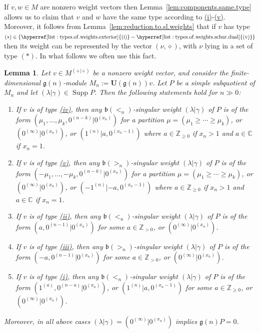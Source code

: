 \documentclass[12pt]{amsart}
\newcommand\C{\mathbb{C}}
\newcommand\Z{\mathbb{Z}}
\newcommand\g{\mathfrak{g}}
\newcommand\fb{\mathfrak{b}}
\newcommand\bU{\mathbf{U}}
\DeclareMathOperator{\Supp}{Supp} %
\theoremstyle{plain}
\newtheorem{lem}[theo]{Lemma}
\theoremstyle{definition}
\numberwithin{equation}{section}
\begin{document}
If $v, w\in M$ are nonzero weight vectors then Lemma~\ref{lem:components.same.type} allows us to claim that $v$ and $w$ have the same type according to \hyperref[list:types.of.weights.exterior]{(i)}-\hyperref[list:types.of.weights.schur.dual]{(v)}. Moreover, it follows from Lemma~\ref{lem:reduction.to.sl.weights} that if $v$ has type $(*) \in {\rm \{\hyperref[list:types.of.weights.exterior]{(i)}-\hyperref[list:types.of.weights.schur.dual]{(v)}\}}$ then its weight can be represented by the vector $(\nu, \diamond)$, with $\nu$ lying in a set of type $(*)$. In what follows we often use this fact.


\begin{lem}\label{lem:possible.h.w}
Let $v\in M^{(\diamond | \diamond)}$ be a nonzero weight vector, and consider the finite-dimensional $\g(n)$-module $M_n := \bU(\g(n)) v$. Let $P$ be a simple subquotient of $M_n$ and let $(\lambda | \gamma)\in \Supp P$. Then the following statements hold for $n\gg 0$:
\begin{enumerate}
\item If $v$ is of type {\rm \hyperref[list:types.of.weights.schur.dual]{(iv)}}, then any $\fb(<_n)$-singular weight $(\lambda | \gamma)$ of $P$ is of the form \linebreak[4] $(\mu_1,\ldots,\mu_k,0^{(n-k)}|0^{(x_n)})$ for a partition $\mu = (\mu_1\geq \cdots \geq \mu_k)$, or $(0^{(\infty)}| 0^{(x_n)})$, or $(1^{(n)}|a, 0^{(x_n-1)})$ where $a\in \Z_{\geq 0}$ if $x_n>1$ and $a\in \C$ if $x_n=1$.
\item If $v$ is of type {\rm \hyperref[list:types.of.weights.schur]{(v)}}, then any $\fb(>_n)$-singular weight  $(\lambda | \gamma)$ of $P$ is of the form \linebreak[4] $(-\mu_1,\ldots,-\mu_k,0^{(n-k)}|0^{(x_n)})$ for a partition $\mu = (\mu_1\geq \cdots \geq \mu_k)$, or $(0^{(\infty)}| 0^{(x_n)})$, or $(-1^{(n)}|-a, 0^{(x_n-1)})$  where $a\in \Z_{\geq 0}$ if $x_n>1$ and $a\in \C$ if $x_n=1$.
\item  If $v$ is of type {\rm \hyperref[list:types.of.weights.symmetric]{(ii)}}, then any $\fb(<_n)$-singular weight $(\lambda | \gamma)$ of $P$ is of the form \linebreak[4] $(a,0^{(n-1)} | 0^{(x_n)})$ for some $a\in \Z_{>0}$, or $(0^{(\infty)}| 0^{(x_n)})$.
\item If $v$ is of type {\rm \hyperref[list:types.of.weights.symmetric]{(iii)}}, then any $\fb(>_n)$-singular weight $(\lambda | \gamma)$ of $P$ is of the form \linebreak[4] $(-a,0^{(n-1)} | 0^{(x_n)})$ for some $a\in \Z_{>0}$, or $(0^{(\infty)}| 0^{(x_n)})$.
\item  If $v$ is of type {\rm \hyperref[list:types.of.weights.exterior]{(i)}}, then any $\fb(<_n)$-singular weight $(\lambda | \gamma)$ of $P$ is of the form \linebreak[4] $(1^{(a)}, 0^{(n-a)}|0^{(x_n)})$, or $(1^{(n)}|a, 0^{(x_n-1)})$ for some $a\in \Z_{\geq 0}$, or $(0^{(\infty)}| 0^{(x_n)})$.
\end{enumerate}
Moreover, in all above cases $(\lambda | \gamma) = (0^{(\infty)}| 0^{(x_n)})$ implies $\g(n)P=0$.
\end{lem}
\end{document}
